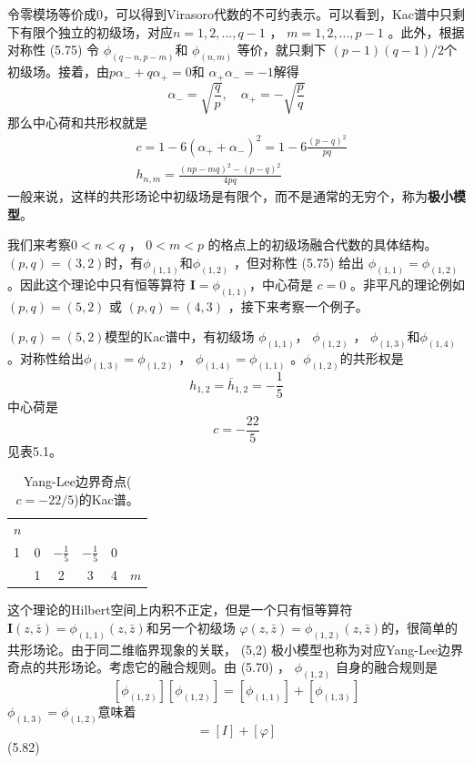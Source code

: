 令零模场等价成$0$，可以得到Virasoro代数的不可约表示。可以看到，Kac谱中只剩下有限个独立的初级场，对应$ n=1,2,...,q-1$ ， $m=1,2,...,p-1$ 。此外，根据对称性 (5.75) 令 $\phi_{(q-n, p-m)} $和 $\phi_{(n, m)}$ 等价，就只剩下 $(p-1)(q-1)/2 $个初级场。接着，由$ p \alpha_{-}+q \alpha_{+}=0 $和 $\alpha_{+} \alpha_{-}=-1 $解得
\begin{equation}
	\alpha_{-}=\sqrt{\frac{q}{p}}, \quad \alpha_{+}=-\sqrt{\frac{p}{q}}
\end{equation}
那么中心荷和共形权就是
\begin{align} &c=1-6\left(\alpha_{+}+\alpha_{-}\right)^{2}=1-6 \frac{(p-q)^{2}}{p q} \\ &h_{n, m}=\frac{(n p-m q)^{2}-(p-q)^{2}}{4 p q} \end{align}
一般来说，这样的共形场论中初级场是有限个，而不是通常的无穷个，称为\textbf{极小模型}。

我们来考察$ 0<n<q$ ， $0<m<p$ 的格点上的初级场融合代数的具体结构。 $(p,q)=(3,2) $时，有$ \phi_{(1,1)} $和$ \phi_{(1,2)}$ ，但对称性 (5.75) 给出 $\phi_{(1,1)}=\phi_{(1,2)} $。因此这个理论中只有恒等算符 $\boldsymbol{I}=\phi_{(1,1)} $，中心荷是 $c=0$ 。非平凡的理论例如 $(p,q)=(5,2)$ 或 $(p,q)=(4,3)$ ，接下来考察一个例子。

$(p,q)=(5,2) $模型的Kac谱中，有初级场 $\phi_{(1,1)} $， $\phi_{(1,2)}$ ， $\phi_{(1,3)} 和 \phi_{(1,4)}$ 。对称性给出$ \phi_{(1,3)}=\phi_{(1,2)}$ ， $\phi_{(1,4)}=\phi_{(1,1)}$ 。$ \phi_{(1,2)} $的共形权是
$$
h_{1,2}=\bar{h}_{1,2}=-\frac{1}{5}
$$
中心荷是
$$
c=-\frac{22}{5}
$$
见表5.1。
\begin{table}[h]
	\centering
	\begin{tabular}{l|ccccc}
		$n$ &   &                &                &   &     \\
		1   & 0 & $-\frac{1}{5}$ & $-\frac{1}{5}$ & 0 &     \\ \hline
		& 1 & 2              & 3              & 4 & $m$
	\end{tabular}
	\caption{Yang-Lee边界奇点($c=-22/5$)的Kac谱。}
\end{table}

这个理论的Hilbert空间上内积不正定，但是一个只有恒等算符 $\boldsymbol{I}(z, \bar{z})=\phi_{(1,1)}(z, \bar{z}) $和另一个初级场 $\varphi(z, \bar{z})=\phi_{(1,2)}(z, \bar{z}) $的，很简单的共形场论。由于同二维临界现象的关联， (5,2) 极小模型也称为对应Yang-Lee边界奇点的共形场论。考虑它的融合规则。由 (5.70) ， $\phi_{(1,2)}$ 自身的融合规则是
\begin{equation}
	\left[\phi_{(1,2)}\right]\left[\phi_{(1,2)}\right]=\left[\phi_{(1,1)}\right]+\left[\phi_{(1,3)}\right]
\end{equation}
$\phi_{(1,3)}=\phi_{(1,2)} $意味着
\begin{equation}
	[\varphi][\varphi]=[I]+[\varphi]
\end{equation}\quad \quad (5.82)

